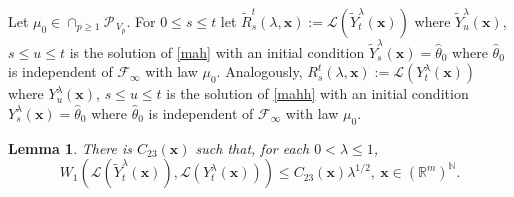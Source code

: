 \documentclass[a4paper,draft]{article}
\newtheorem{lemma}[theorem]{Lemma}
\begin{document}
Let $\mu_0\in\cap_{p\geq 1}\mathcal{P}_{\, V_p}$. For $0\leq s\leq t$ let 
$\tilde{R}_s^t(\lambda,\mathbf{x}):=\mathcal{L}(\tilde{Y}_t^{\lambda}(\mathbf{x}))$
where $\tilde{Y}_u^{\lambda}(\mathbf{x})$, $s\leq u\leq t$ is the solution 
of \eqref{mah} with an initial condition $\tilde{Y}_s^{\lambda}(\mathbf{x})=\hat{\theta}_0$
where $\hat{\theta}_0$ is independent of $\mathcal{F}_{\infty}$ with law $\mu_0$.
Analogously, ${R}_s^t(\lambda,\mathbf{x}):=\mathcal{L}({Y}_t^{\lambda}(\mathbf{x}))$
where ${Y}_u^{\lambda}(\mathbf{x})$, $s\leq u\leq t$ is the solution 
of \eqref{mahh} with an initial condition ${Y}_s^{\lambda}(\mathbf{x})=\hat{\theta}_0$
where $\hat{\theta}_0$ is independent of $\mathcal{F}_{\infty}$ with law $\mu_0$.


\begin{lemma}\label{kl} There is 
$C_{23}(\mathbf{x})$ such that, for each $0<\lambda\leq 1$, 
$$
W_1(\mathcal{L}(\tilde{Y}^{\lambda}_t(\mathbf{x})),
\mathcal{L}(Y^{\lambda}_t(\mathbf{x})))\leq
C_{23}(\mathbf{x})\lambda^{1/2},\ \mathbf{x}\in(\mathbb{R}^m)^{\mathbb{N}}.
$$
\end{lemma}
\end{document}
